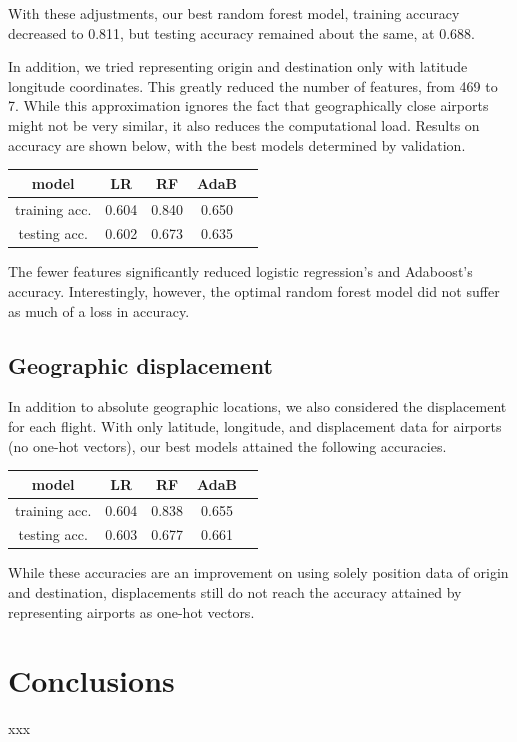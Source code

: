 \documentclass{article}
\begin{document}
\begin{multicols}{2}
With these adjustments,
our best random forest model,
training accuracy decreased to 0.811,
but testing accuracy remained about the same,
at 0.688.

In addition, we tried representing origin and destination
only with latitude longitude coordinates.
This greatly reduced the number of features, from 469 to 7.
While this approximation ignores the fact that
geographically close airports might not be very similar,
it also reduces the computational load.
Results on accuracy are shown below,
with the best models determined by validation.

\begin{center}
    \begin{tabular}{c|cccc}
        model &
          LR & RF & AdaB \\\hline
        training acc. &
          0.604 & 0.840 & 0.650 \\
        testing acc. &
          0.602 & 0.673 & 0.635
    \end{tabular}
\end{center}

The fewer features significantly reduced
logistic regression's and Adaboost's accuracy.
Interestingly, however, the optimal random forest model
did not suffer as much of a loss in accuracy.

\subsection{Geographic displacement}

In addition to absolute geographic locations,
we also considered the displacement
for each flight.
With only latitude, longitude, and displacement data
for airports (no one-hot vectors),
our best models attained the following accuracies.

\begin{center}
    \begin{tabular}{c|cccc}
        model &
          LR & RF & AdaB \\\hline
        training acc. &
          0.604 & 0.838 & 0.655 \\
        testing acc. &
          0.603 & 0.677 & 0.661
    \end{tabular}
\end{center}

While these accuracies are an improvement
on using solely position data of origin and destination,
displacements still do not reach the accuracy attained
by representing airports as one-hot vectors.

\section{Conclusions}

xxx

\end{multicols}
\end{document}
